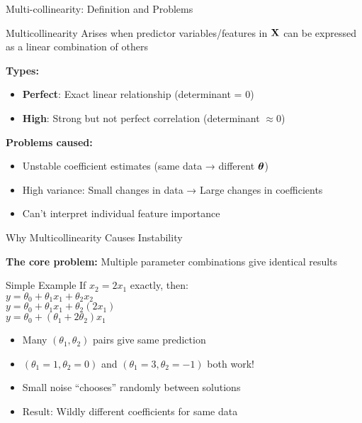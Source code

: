 \documentclass{beamer}
\begin{document}
    
    
    
    
    \begin{frame}{Multi-collinearity: Definition and Problems}
    
    \begin{definitionbox}{Multicollinearity}
    Arises when predictor variables/features in $\mathbf{X}$ can be expressed as a linear combination of others
    \end{definitionbox}
    
    \textbf{Types:}
    \begin{itemize}[<+->]
        \item \textbf{Perfect}: Exact linear relationship (determinant = 0)
        \item \textbf{High}: Strong but not perfect correlation (determinant $\approx 0$)
    \end{itemize}
    
    \pause
    \textbf{Problems caused:}
    \begin{itemize}[<+->]
        \item Unstable coefficient estimates (same data → different $\boldsymbol{\theta}$)
        \item High variance: Small changes in data → Large changes in coefficients
        \item Can't interpret individual feature importance
    \end{itemize}
    \end{frame}
    
    \begin{frame}{Why Multicollinearity Causes Instability}
    
    \textbf{The core problem:} Multiple parameter combinations give identical results
    
    \begin{examplebox}{Simple Example}
    If $x_2 = 2x_1$ exactly, then:
    \\ $y = \theta_0 + \theta_1 x_1 + \theta_2 x_2$
    \\ $y = \theta_0 + \theta_1 x_1 + \theta_2 (2x_1)$
    \\ $y = \theta_0 + (\theta_1 + 2\theta_2) x_1$
    \end{examplebox}
    
    \pause
    \begin{itemize}[<+->]
        \item Many $(\theta_1, \theta_2)$ pairs give same prediction
        \item $(\theta_1=1, \theta_2=0)$ and $(\theta_1=3, \theta_2=-1)$ both work!
        \item Small noise ``chooses'' randomly between solutions
        \item Result: Wildly different coefficients for same data
    \end{itemize}
    \end{frame}
    
\end{document}
